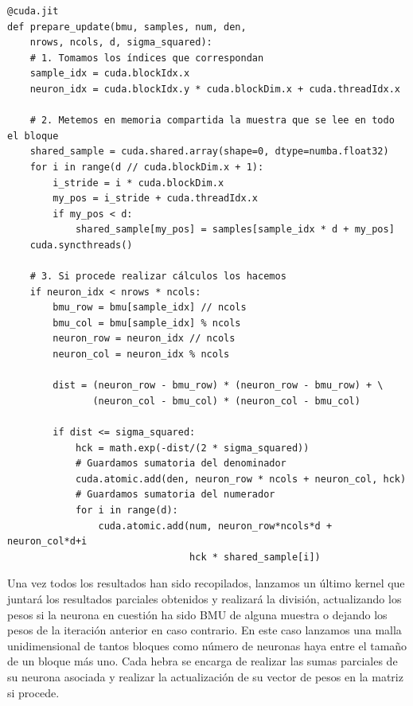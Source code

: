 \begin{code}
\begin{verbatim}
@cuda.jit
def prepare_update(bmu, samples, num, den, 
    nrows, ncols, d, sigma_squared):
    # 1. Tomamos los índices que correspondan
    sample_idx = cuda.blockIdx.x
    neuron_idx = cuda.blockIdx.y * cuda.blockDim.x + cuda.threadIdx.x
   
    # 2. Metemos en memoria compartida la muestra que se lee en todo el bloque
    shared_sample = cuda.shared.array(shape=0, dtype=numba.float32)
    for i in range(d // cuda.blockDim.x + 1):
        i_stride = i * cuda.blockDim.x
        my_pos = i_stride + cuda.threadIdx.x
        if my_pos < d:
            shared_sample[my_pos] = samples[sample_idx * d + my_pos]
    cuda.syncthreads()
    
    # 3. Si procede realizar cálculos los hacemos
    if neuron_idx < nrows * ncols:
        bmu_row = bmu[sample_idx] // ncols
        bmu_col = bmu[sample_idx] % ncols
        neuron_row = neuron_idx // ncols
        neuron_col = neuron_idx % ncols
        
        dist = (neuron_row - bmu_row) * (neuron_row - bmu_row) + \
               (neuron_col - bmu_col) * (neuron_col - bmu_col)
        
        if dist <= sigma_squared:
            hck = math.exp(-dist/(2 * sigma_squared))
            # Guardamos sumatoria del denominador
            cuda.atomic.add(den, neuron_row * ncols + neuron_col, hck)
            # Guardamos sumatoria del numerador
            for i in range(d):
                cuda.atomic.add(num, neuron_row*ncols*d + neuron_col*d+i
                                hck * shared_sample[i])
\end{verbatim}
\label{code:partials}
\end{code}

Una vez todos los resultados han sido recopilados, lanzamos un último kernel que juntará los resultados parciales obtenidos y realizará la división, actualizando los pesos si la neurona en cuestión ha sido BMU de alguna muestra o dejando los pesos de la iteración anterior en caso contrario. En este caso lanzamos una malla unidimensional de tantos bloques como número de neuronas haya entre el tamaño de un bloque más uno. Cada hebra se encarga de realizar las sumas parciales de su neurona asociada y realizar la actualización de su vector de pesos en la matriz si procede.

